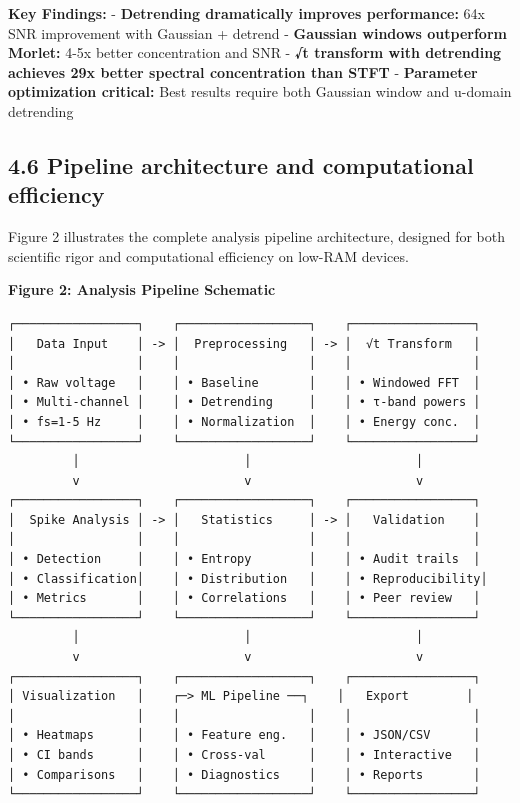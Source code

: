 \documentclass[
  11pt,
]{article}
\begin{document}
\textbf{Key Findings:} - \textbf{Detrending dramatically improves
performance:} 64x SNR improvement with Gaussian + detrend -
\textbf{Gaussian windows outperform Morlet:} 4-5x better concentration
and SNR - \textbf{√t transform with detrending achieves 29x better
spectral concentration than STFT} - \textbf{Parameter optimization
critical:} Best results require both Gaussian window and u-domain
detrending

\hypertarget{pipeline-architecture-and-computational-efficiency}{%
\subsection{4.6 Pipeline architecture and computational
efficiency}\label{pipeline-architecture-and-computational-efficiency}}

Figure 2 illustrates the complete analysis pipeline architecture,
designed for both scientific rigor and computational efficiency on
low-RAM devices.

\textbf{Figure 2: Analysis Pipeline Schematic}

\begin{verbatim}
┌─────────────────┐    ┌──────────────────┐    ┌─────────────────┐
│   Data Input    │ -> │  Preprocessing   │ -> │  √t Transform   │
│                 │    │                  │    │                 │
│ • Raw voltage   │    │ • Baseline       │    │ • Windowed FFT  │
│ • Multi-channel │    │ • Detrending     │    │ • τ-band powers │
│ • fs=1-5 Hz     │    │ • Normalization  │    │ • Energy conc.  │
└─────────────────┘    └──────────────────┘    └─────────────────┘
         │                       │                       │
         v                       v                       v
┌─────────────────┐    ┌──────────────────┐    ┌─────────────────┐
│  Spike Analysis │ -> │   Statistics     │ -> │   Validation    │
│                 │    │                  │    │                 │
│ • Detection     │    │ • Entropy        │    │ • Audit trails  │
│ • Classification│    │ • Distribution   │    │ • Reproducibility│
│ • Metrics       │    │ • Correlations   │    │ • Peer review   │
└─────────────────┘    └──────────────────┘    └─────────────────┘
         │                       │                       │
         v                       v                       v
┌─────────────────┐    ┌──────────────────┐    ┌─────────────────┐
│ Visualization   │    ┌─> ML Pipeline ──┐    │   Export        │
│                 │    │                  │    │                 │
│ • Heatmaps      │    │ • Feature eng.   │    │ • JSON/CSV      │
│ • CI bands      │    │ • Cross-val      │    │ • Interactive   │
│ • Comparisons   │    │ • Diagnostics    │    │ • Reports       │
└─────────────────┘    └──────────────────┘    └─────────────────┘
\end{verbatim}
\end{document}
